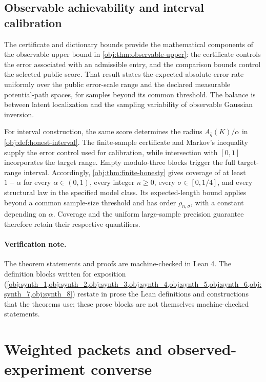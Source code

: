 \documentclass[11pt]{article}
\begin{document}
\subsection{Observable achievability and interval calibration}

The certificate and dictionary bounds provide the mathematical components of the observable upper bound in \cref{obj:thm:observable-upper}: the certificate controls the error associated with an admissible entry, and the comparison bounds control the selected public score. That result states the expected absolute-error rate uniformly over the public error-scale range and the declared measurable potential-path spaces, for samples beyond its common threshold. The balance is between latent localization and the sampling variability of observable Gaussian inversion.

For interval construction, the same score determines the radius \(A_{\widehat q}(K)/\alpha\) in \cref{obj:def:honest-interval}. The finite-sample certificate and Markov's inequality supply the error control used for calibration, while intersection with \([0,1]\) incorporates the target range. Empty modulo-three blocks trigger the full target-range interval. Accordingly, \cref{obj:thm:finite-honesty} gives coverage of at least \(1-\alpha\) for every \(\alpha\in(0,1)\), every integer \(n\ge0\), every \(\sigma\in[0,1/4]\), and every structural law in the specified model class. Its expected-length bound applies beyond a common sample-size threshold and has order \(\rho_{n,\sigma}\), with a constant depending on \(\alpha\). Coverage and the uniform large-sample precision guarantee therefore retain their respective quantifiers.

\paragraph{Verification note.}
The theorem statements and proofs are machine-checked in Lean 4. The definition blocks written for exposition (\cref{obj:synth_1,obj:synth_2,obj:synth_3,obj:synth_4,obj:synth_5,obj:synth_6,obj:synth_7,obj:synth_8}) restate in prose the Lean definitions and constructions that the theorems use; these prose blocks are not themselves machine-checked statements.


\section{Weighted packets and observed-experiment converse}
\end{document}
